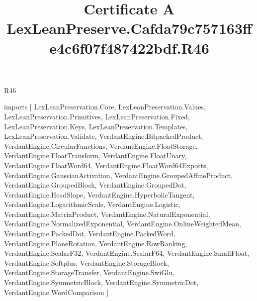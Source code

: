 \begin{lexlean}{R46}
\title{Certificate A LexLeanPreserve.Cafda79c757163ffe4c6f07f487422bdf.R46}
\begin{coremodule}
imports [
  LexLeanPreservation.Core,
  LexLeanPreservation.Values,
  LexLeanPreservation.Primitives,
  LexLeanPreservation.Fixed,
  LexLeanPreservation.Keys,
  LexLeanPreservation.Templates,
  LexLeanPreservation.Validate,
  VerdantEngine.BitpackedProduct,
  VerdantEngine.CircularFunctions,
  VerdantEngine.FloatStorage,
  VerdantEngine.FloatTransform,
  VerdantEngine.FloatUnary,
  VerdantEngine.FloatWord64,
  VerdantEngine.FloatWord64Exports,
  VerdantEngine.GaussianActivation,
  VerdantEngine.GroupedAffineProduct,
  VerdantEngine.GroupedBlock,
  VerdantEngine.GroupedDot,
  VerdantEngine.HeadSlope,
  VerdantEngine.HyperbolicTangent,
  VerdantEngine.LogarithmicScale,
  VerdantEngine.Logistic,
  VerdantEngine.MatrixProduct,
  VerdantEngine.NaturalExponential,
  VerdantEngine.NormalizedExponential,
  VerdantEngine.OnlineWeightedMean,
  VerdantEngine.PackedDot,
  VerdantEngine.PackedWord,
  VerdantEngine.PlaneRotation,
  VerdantEngine.RowRanking,
  VerdantEngine.ScalarF32,
  VerdantEngine.ScalarF64,
  VerdantEngine.SmallFloat,
  VerdantEngine.Softplus,
  VerdantEngine.StorageBlock,
  VerdantEngine.StorageTransfer,
  VerdantEngine.SwiGlu,
  VerdantEngine.SymmetricBlock,
  VerdantEngine.SymmetricDot,
  VerdantEngine.WordComparison
]


\end{coremodule}
\end{lexlean}
